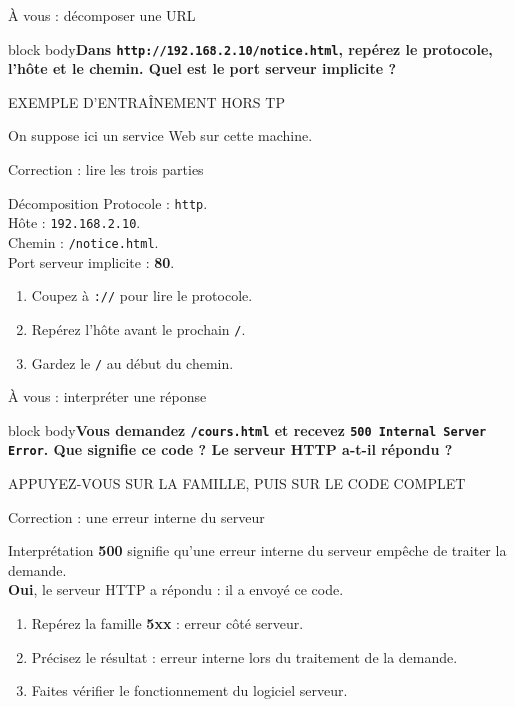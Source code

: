 \documentclass[aspectratio=169,11pt]{beamer}
\newcommand{\question}[1]{\begin{beamercolorbox}[rounded=true,sep=12pt]{block body}\Large\textbf{#1}\end{beamercolorbox}}
\newcommand{\etiquette}[1]{{\color{or}\small\MakeUppercase{#1}}}
\begin{document}
\begin{frame}{À vous : décomposer une URL}
  \question{Dans \texttt{http://192.168.2.10/notice.html}, repérez le protocole,
    l'hôte et le chemin. Quel est le port serveur implicite ?}
  \bigskip
  \etiquette{Exemple d'entraînement hors TP}\par
  \small On suppose ici un service Web sur cette machine.
\end{frame}

\begin{frame}{Correction : lire les trois parties}
  \begin{block}{Décomposition}
    Protocole : \texttt{http}.\\
    Hôte : \texttt{192.168.2.10}.\\
    Chemin : \texttt{/notice.html}.\\
    Port serveur implicite : \textbf{80}.
  \end{block}
  \begin{enumerate}
    \item Coupez à \texttt{://} pour lire le protocole.
    \item Repérez l'hôte avant le prochain \texttt{/}.
    \item Gardez le \texttt{/} au début du chemin.
  \end{enumerate}
\end{frame}

\begin{frame}{À vous : interpréter une réponse}
  \question{Vous demandez \texttt{/cours.html} et recevez \texttt{500 Internal Server Error}.
    Que signifie ce code ? Le serveur HTTP a-t-il répondu ?}
  \bigskip
  \etiquette{Appuyez-vous sur la famille, puis sur le code complet}
\end{frame}

\begin{frame}{Correction : une erreur interne du serveur}
  \begin{block}{Interprétation}
    \textbf{500} signifie qu'une erreur interne du serveur empêche de traiter la demande.\\
    \textbf{Oui}, le serveur HTTP a répondu : il a envoyé ce code.
  \end{block}
  \begin{enumerate}
    \item Repérez la famille \textbf{5xx} : erreur côté serveur.
    \item Précisez le résultat : erreur interne lors du traitement de la demande.
    \item Faites vérifier le fonctionnement du logiciel serveur.
  \end{enumerate}
\end{frame}
\end{document}
